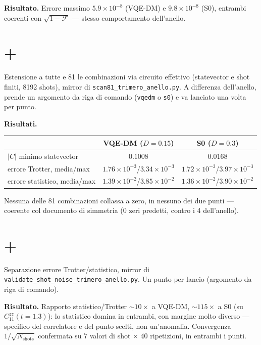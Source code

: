 \documentclass[11pt,a4paper]{article}
\begin{document}
\textbf{Risultato.} Errore massimo $5.9\times10^{-8}$ (VQE-DM) e $9.8\times10^{-8}$ (S0), entrambi
coerenti con $\sqrt{1-\mathcal F}$ — stesso comportamento dell'anello.

\section*{\texttt{} + \texttt{}}

Estensione a tutte e 81 le combinazioni via circuito effettivo (statevector e shot finiti, 8192
shots), mirror di \texttt{scan81\_trimero\_anello.py}. A differenza dell'anello, prende un
argomento da riga di comando (\texttt{vqedm} o \texttt{s0}) e va lanciato una volta per punto.

\textbf{Risultati.}
\begin{center}
\begin{tabular}{lcc}
\toprule
& VQE-DM ($D{=}0.15$) & S0 ($D{=}0.3$) \\
\midrule
$|C|$ minimo statevector & $0.1008$ & $0.0168$ \\
errore Trotter, media/max & $1.76\times10^{-3}$/$3.34\times10^{-3}$ & $1.72\times10^{-3}$/$3.97\times10^{-3}$\\
errore statistico, media/max & $1.39\times10^{-2}$/$3.85\times10^{-2}$ & $1.36\times10^{-2}$/$3.90\times10^{-2}$\\
\bottomrule
\end{tabular}
\end{center}
Nessuna delle 81 combinazioni collassa a zero, in nessuno dei due punti — coerente col documento
di simmetria (0 zeri predetti, contro i 4 dell'anello).

\section*{\texttt{} + \texttt{}}

Separazione errore Trotter/statistico, mirror di
\texttt{validate\_shot\_noise\_trimero\_anello.py}. Un punto per lancio (argomento da riga di
comando).

\textbf{Risultato.} Rapporto statistico/Trotter $\sim10\times$ a VQE-DM, $\sim115\times$ a S0
(su $C_{11}^{zz}(t{=}1.3)$): lo statistico domina in entrambi, con margine molto diverso —
specifico del correlatore e del punto scelti, non un'anomalia. Convergenza $1/\sqrt{N_\text{shots}}$
confermata su 7 valori di shot $\times$ 40 ripetizioni, in entrambi i punti.
\end{document}
